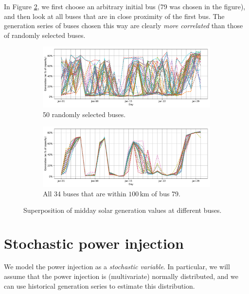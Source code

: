 \documentclass[main.tex]{subfiles}
\begin{document}
In Figure \ref{fig:solarcovclose}, we first choose an arbitrary initial bus (79 was chosen in the figure), and then look at all buses that are in close proximity of the first bus. The generation series of buses chosen this way are clearly \emph{more correlated} than those of randomly selected buses.

\begin{figure}[ht]
\begin{subfigure}{\textwidth}
    \centering
    \includegraphics[width=\textwidth]{img/solar_cov_random.pdf}
    \caption{50 randomly selected buses.}\label{fig:solarcovrandom}
\end{subfigure}
\begin{subfigure}{\textwidth}
    \centering
    \includegraphics[width=\textwidth]{img/solar_cov_close.pdf}
    \caption{All 34 buses that are within $100\,\si{\kilo\meter}$ of bus 79.}\label{fig:solarcovclose}
\end{subfigure}
    \caption{Superposition of midday solar generation values at different buses.}\label{fig:solarcov}
\end{figure}

\section{Stochastic power injection}
We model the power injection as a \emph{stochastic variable}. In particular, we will assume that the power injection is (multivariate) normally distributed, and we can use historical generation series to estimate this distribution. 
\end{document}
